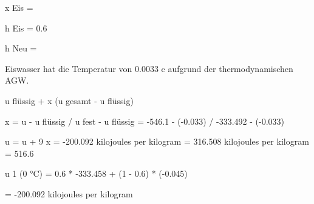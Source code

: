 x Eis =

h Eis = 0.6

h Neu =

Eiswasser hat die Temperatur von 0.0033 c aufgrund der thermodynamischen AGW.

u flüssig + x (u gesamt - u flüssig)

x = u - u flüssig / u fest - u flüssig = -546.1 - (-0.033) / -333.492 - (-0.033)

u = u + 9 x = -200.092 kilojoules per kilogram = 316.508 kilojoules per kilogram = 516.6

u 1 (0 °C) = 0.6 * -333.458 + (1 - 0.6) * (-0.045)

= -200.092 kilojoules per kilogram